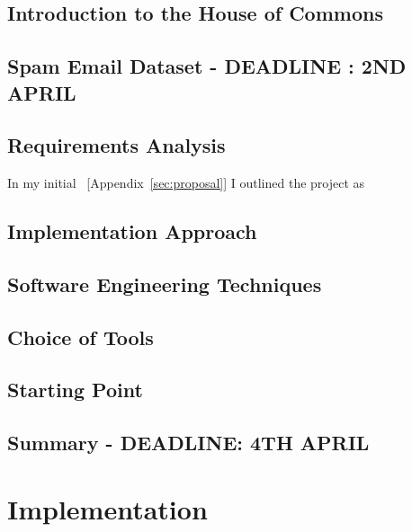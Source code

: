 \documentclass[12pt,a4paper,twoside,openright]{report}
\begin{document}
\section{Introduction to the House of Commons}


\section{Spam Email Dataset - DEADLINE : 2ND APRIL}


\section{Requirements Analysis}

In my initial~ [Appendix~\ref{sec:proposal}] I outlined the project as 
\section{Implementation Approach}



\section{Software Engineering Techniques}



\section{Choice of Tools}



\section{Starting Point}


\section{Summary - DEADLINE: 4TH APRIL}


\chapter{Implementation}
\end{document}
